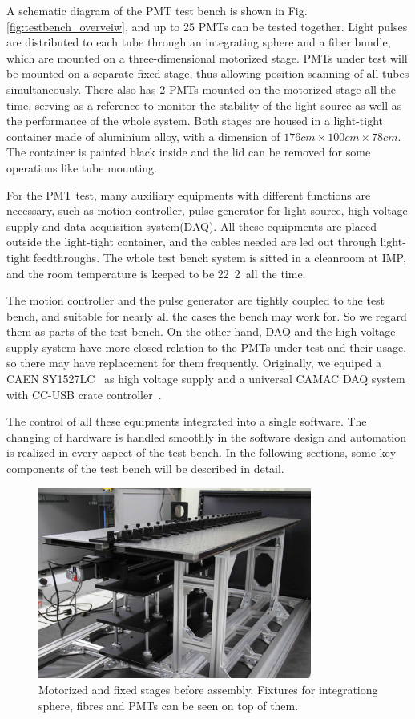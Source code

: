 \documentclass[5p, times]{elsarticle}
\begin{document}
A schematic diagram of the PMT test bench is shown in Fig.\ref{fig:testbench_overveiw}, and up to 25 PMTs can be tested together.
Light pulses are distributed to each tube through an integrating sphere and a fiber bundle, which are mounted on a three-dimensional motorized stage.
PMTs under test will be mounted on a separate fixed stage, thus allowing position scanning of all tubes simultaneously.
There also has 2 PMTs mounted on the motorized stage all the time, serving as a reference to monitor the stability of the light source as well as the performance of the whole system.
Both stages are housed in a light-tight container made of aluminium alloy, with a dimension of $176cm\times100cm\times78cm$.
The container is painted black inside and the lid can be removed for some operations like tube mounting.

For the PMT test, many auxiliary equipments with different functions are necessary, such as motion controller, pulse generator for light source, high voltage supply and data acquisition system(DAQ). All these equipments are placed outside the light-tight container, and the cables needed are led out through light-tight feedthroughs.
The whole test bench system is sitted in a cleanroom at IMP, and the room temperature is keeped to be 22\textpm~2\textcelsius~all the time. 

The motion controller and the pulse generator are tightly coupled to the test bench, and suitable for nearly all the cases the bench may work for. So we regard them as parts of the test bench.
On the other hand, DAQ and the high voltage supply system have more closed relation to the PMTs under test and their usage, so there may have replacement for them frequently. Originally, we equiped a CAEN SY1527LC~\cite{sy1527lc} as high voltage supply and a universal CAMAC DAQ system with CC-USB crate controller~\cite{cc_usb}.

The control of all these equipments integrated into a single software. The changing of hardware is handled smoothly in the software design and automation is realized in every aspect of the test bench.
In the following sections, some key components of the test bench will be described in detail.

\begin{figure}
 \centering
 \includegraphics[width=90mm]{stage1_crop}
\caption{Motorized and fixed stages before assembly.
Fixtures for integrationg sphere, fibres and PMTs can be seen on top of them.}
\label{fig:stages}
\end{figure} 
\end{document}
